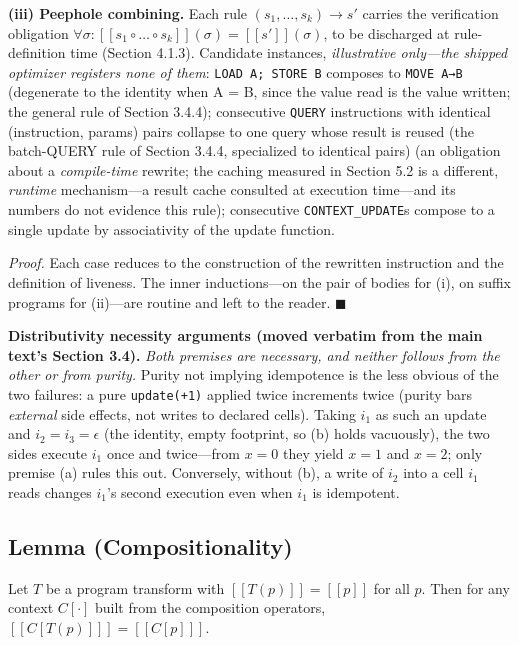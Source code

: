 \documentclass[
  11pt,
]{article}
\newcounter{none} %
\newcommand{\llbracket}{[\![}
\newcommand{\rrbracket}{]\!]}
\begin{document}
\textbf{(iii) Peephole combining.} Each rule
\((s_1, \dots, s_k) \rightarrow s'\) carries the verification obligation
\(\forall \sigma: \llbracket s_1 \circ \dots \circ s_k \rrbracket(\sigma) = \llbracket s' \rrbracket(\sigma)\),
to be discharged at rule-definition time (Section 4.1.3). Candidate
instances, \emph{illustrative only---the shipped optimizer registers
none of them}: \texttt{LOAD\ A;\ STORE\ B} composes to
\texttt{MOVE\ A→B} (degenerate to the identity when A = B, since the
value read is the value written; the general rule of Section 3.4.4);
consecutive \texttt{QUERY} instructions with identical (instruction,
params) pairs collapse to one query whose result is reused (the
batch-QUERY rule of Section 3.4.4, specialized to identical pairs) (an
obligation about a \emph{compile-time} rewrite; the caching measured in
Section 5.2 is a different, \emph{runtime} mechanism---a result cache
consulted at execution time---and its numbers do not evidence this
rule); consecutive \texttt{CONTEXT\_UPDATE}s compose to a single update
by associativity of the update function.

\emph{Proof.} Each case reduces to the construction of the rewritten
instruction and the definition of liveness. The inner inductions---on
the pair of bodies for (i), on suffix programs for (ii)---are routine
and left to the reader. \(\blacksquare\)

\textbf{Distributivity necessity arguments (moved verbatim from the main
text's Section 3.4).} \emph{Both premises are necessary, and neither
follows from the other or from purity.} Purity not implying idempotence
is the less obvious of the two failures: a pure \texttt{update(+1)}
applied twice increments twice (purity bars \emph{external} side
effects, not writes to declared cells). Taking \(i_1\) as such an update
and \(i_2 = i_3 = \epsilon\) (the identity, empty footprint, so (b)
holds vacuously), the two sides execute \(i_1\) once and twice---from
\(x = 0\) they yield \(x = 1\) and \(x = 2\); only premise (a) rules
this out. Conversely, without (b), a write of \(i_2\) into a cell
\(i_1\) reads changes \(i_1\)'s second execution even when \(i_1\) is
idempotent.

\subsection{Lemma (Compositionality)}\label{lemma-compositionality}

Let \(T\) be a program transform with
\(\llbracket T(p) \rrbracket = \llbracket p \rrbracket\) for all \(p\).
Then for any context \(C[\cdot]\) built from the composition operators,
\(\llbracket C[T(p)] \rrbracket = \llbracket C[p] \rrbracket\).
\end{document}
